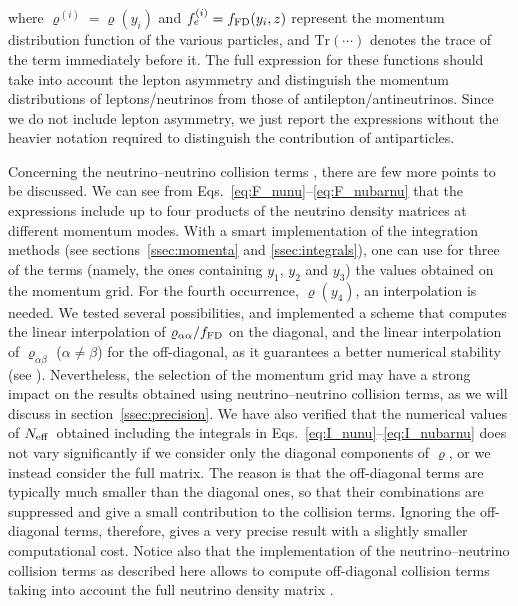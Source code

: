 \documentclass[notitlepage,nofootinbib,showpacs,preprintnumbers,amsmath,amssymb,superscriptaddress,prd,onecolumn]{revtex4-1}
\newcommand{\Neff}{\ensuremath{N_{\rm eff}}}
\begin{document}
where $\varrho^{(i)}=\varrho(y_i)$ and $f_e^{(i)}=f_{\rm FD}(y_i, z)$ represent the momentum distribution function
of the various particles,
and $\mathrm{Tr}(\cdots)$ denotes the trace of the term immediately before it.
The full expression for these functions should take into account the lepton asymmetry and distinguish
the momentum distributions of leptons/neutrinos from those of antilepton/antineutrinos.
Since we do not include lepton asymmetry, we just report the expressions without the heavier notation
required to distinguish the contribution of antiparticles.

Concerning the neutrino--neutrino collision terms \cite{Bennett:2020zkv},
there are few more points to be discussed.
We can see from Eqs.~\eqref{eq:F_nunu}--\eqref{eq:F_nubarnu} that the expressions include
up to four products of the neutrino density matrices at different momentum modes.
With a smart implementation of the integration methods
(see sections~\ref{ssec:momenta} and \ref{ssec:integrals}),
one can use for three of the terms (namely, the ones containing $y_1$, $y_2$ and $y_3$)
the values obtained on the momentum grid.
For the fourth occurrence, $\varrho(y_4)$, an interpolation is needed.
We tested several possibilities, and implemented a scheme that computes
the linear interpolation of $\varrho_{\alpha\alpha}/f_{\rm FD}$ on the diagonal,
and the linear interpolation of $\varrho_{\alpha\beta}$ ($\alpha\neq\beta$) for the off-diagonal,
as it guarantees a better numerical stability (see \cite{Bennett:2020zkv}).
Nevertheless, the selection of the momentum grid may have a strong impact on the results obtained using
neutrino--neutrino collision terms, as we will discuss in section~\ref{ssec:precision}.
We have also verified that the numerical values of \Neff\ obtained including the integrals in
Eqs.~\eqref{eq:I_nunu}--\eqref{eq:I_nubarnu}
does not vary significantly if we consider only the diagonal components of $\varrho$,
or we instead consider the full matrix.
The reason is that the off-diagonal terms are typically much smaller than the diagonal ones,
so that their combinations are suppressed and give a small contribution to the collision terms.
Ignoring the off-diagonal terms, therefore, gives a very precise result with a slightly smaller computational cost.
Notice also that the implementation of the neutrino--neutrino collision terms as described here
allows to compute off-diagonal collision terms
taking into account the full neutrino density matrix \cite{Bennett:2020zkv}.
\end{document}
